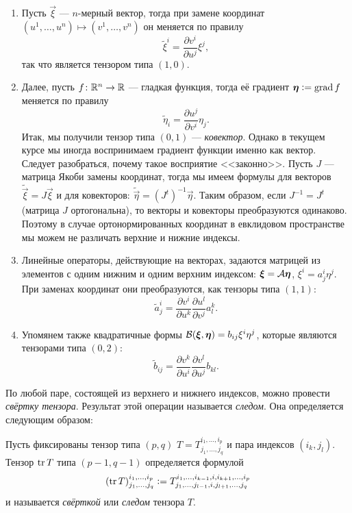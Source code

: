 \begin{example}
	\begin{enumerate}[nolistsep, label=(\arabic*)]
		\item Пусть $\vec{\xi}$ --- $n$-мерный вектор, тогда при замене координат $(u^1, \ldots, u^n) \mapsto (v^1, \ldots, v^n)$ он меняется по правилу
			\[
				\widetilde{\xi}^i = \frac{\partial v^i}{\partial u^j}\xi^j,
			\]
			так что является тензором типа $(1, 0)$.
		\item Далее, пусть $f\colon \mathbb{R}^n \to \mathbb{R}$ --- гладкая функция, тогда её градиент $\boldsymbol{\eta} \vcentcolon = \operatorname{grad} f$ меняется по правилу
			\[
				\widetilde{\eta}_i = \frac{\partial u^j}{\partial v^i}\eta_j.
			\]
			Итак, мы получили тензор типа $(0, 1)$ --- \textit{ковектор}. Однако в текущем курсе мы иногда воспринимаем градиент функции именно как вектор. Следует разобраться, почему такое восприятие <<законно>>. Пусть $J$ --- матрица Якоби замены координат, тогда мы имеем формулы для векторов $\widetilde{\vec{\xi}} = J\vec{\xi}$ и для ковекторов: $\widetilde{\vec{\eta}} = (J^t)^{-1}\vec{\eta}$. Таким образом, если $J^{-1} = J^t$ (матрица $J$ ортогональна), то векторы и ковекторы преобразуются одинаково. Поэтому в случае ортонормированных координат в евклидовом пространстве мы можем не различать верхние и нижние индексы.
		\item Линейные операторы, действующие на векторах, задаются матрицей из элементов с одним нижним и одним верхним индексом: $\boldsymbol{\xi} = \mathcal{A}\boldsymbol{\eta}$, $\xi^i = a^i_j\eta^j$. При заменах координат они преобразуются, как тензоры типа $(1, 1)$:
			\[
				\widetilde{a}^i_j = \frac{\partial v^i}{\partial u^k}\frac{\partial u^l}{\partial v^j}a^k_l.
			\]
		\item Упомянем также квадратичные формы $\mathcal{B}(\boldsymbol{\xi}, \boldsymbol{\eta}) = b_{ij}\xi^i\eta^j$, которые являются тензорами типа $(0, 2)$:
			\[
				\widetilde{b}_{ij} = \frac{\partial v^k}{\partial u^i}\frac{\partial v^l}{\partial u^j}b_{kl}.
			\]
	\end{enumerate}
\end{example}

По любой паре, состоящей из верхнего и нижнего индексов, можно провести \textit{свёртку тензора}. Результат этой операции называется \textit{следом}. Она определяется следующим образом:

\begin{definition}
	Пусть фиксированы тензор типа $(p, q)$ $T = T^{i_1, \ldots, i_p}_{j_1, \ldots, j_q}$ и пара индексов $(i_k, j_l)$. Тензор $\operatorname{tr} T$ типа $(p - 1, q - 1)$ определяется формулой
	\[
		(\operatorname{tr} T)^{i_1, \ldots, i_p}_{j_1, \ldots, j_q} \vcentcolon = T^{i_1, \ldots, i_{k - 1}, i, i_{k + 1}, \ldots, i_p}_{j_1, \ldots, j_{l - 1}, i, j_{l + 1}, \ldots, j_q}
	\]
	и называется \textit{свёрткой} или \textit{следом} тензора $T$.
\end{definition}


